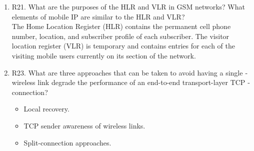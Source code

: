 \documentclass[12pt]{article}
\begin{document}
\begin{enumerate}
\item R21. What are the purposes of the HLR and VLR in GSM networks? What elements of mobile IP are similar to the HLR and VLR?\\[1em]
The Home  Location  Register (HLR) contains the permanent cell phone number, location, and subscriber profile of each subscriber. The visitor location register (VLR) is temporary and contains entries for each of the visiting mobile users currently on its section of the network.
\item R23. What are three approaches that can be taken to avoid having a single ­wireless link degrade the performance of an end-to-end transport-layer TCP ­connection?
\begin{itemize}
	\item Local recovery.
	\item TCP sender awareness of wireless links.
	\item Split-connection approaches.
\end{itemize}
\end{enumerate}
\end{document}
